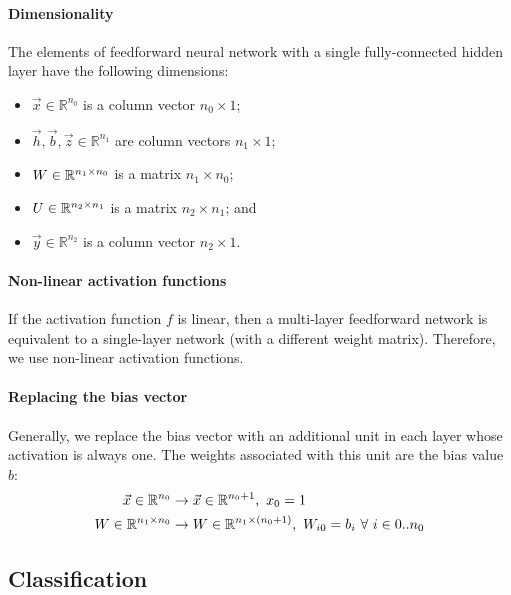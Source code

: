 \paragraph{Dimensionality}

The elements of feedforward neural network with a single fully-connected hidden
layer have the following dimensions:
\begin{itemize}
  \item $\vec{x} \in \mathbb{R}^{n_0}$ is a column vector $n_0 \times 1$;
  \item $\vec{h}, \vec{b}, \vec{z} \in \mathbb{R}^{n_1}$ are column vectors $n_1 \times 1$;
  \item $W \in \mathbb{R}^{n_1 \times n_0}$ is a matrix $n_1 \times n_0$;
  \item $U \in \mathbb{R}^{n_2 \times n_1}$ is a matrix $n_2 \times n_1$; and
  \item $\vec{y} \in \mathbb{R}^{n_2}$ is a column vector $n_2 \times 1$.
\end{itemize}

\paragraph{Non-linear activation functions}

If the activation function $f$ is linear, then a multi-layer feedforward
network is equivalent to a single-layer network (with a different weight
matrix).
Therefore, we use non-linear activation functions.

\paragraph{Replacing the bias vector}

Generally, we replace the bias vector with an additional unit in each layer
whose activation is always one.
The weights associated with this unit are the bias value $b$:
\begin{align*}
  \vec{x} \in \mathbb{R}^{n_0}
   & \to \vec{x} \in \mathbb{R}^{n_0 + 1},\
  x_0 = 1
  \\
  W \in \mathbb{R}^{n_1 \times n_0}
   & \to W \in \mathbb{R}^{n_1 \times (n_0 + 1)},\
  W_{i0} = b_i \ \forall\ i \in 0 .. n_0
  \\
\end{align*}

\subsection{Classification}
\label{sec:7:nn-classification}

